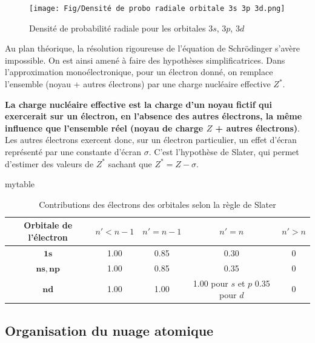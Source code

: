 \documentclass{article}
\begin{document}
\begin{figure}[ht]
    \centering
    \texttt{[image: Fig/Densité de probo radiale orbitale 3s 3p 3d.png]}
    \caption{Densité de probabilité radiale pour les orbitales $3s$, $3p$, $3d$}
    \label{fig:Densité de probo radiale orbitale 3s 3p 3d}
\end{figure}

Au plan théorique, la résolution rigoureuse de l'équation de Schrödinger s'avère impossible. On est ainsi amené à faire des hypothèses simplificatrices. Dans l'approximation monoélectronique, pour un électron donné, on remplace l'ensemble (noyau + autres électrons) par une charge nucléaire effective $Z^*$. 

\textbf{La charge nucléaire effective est la charge d'un noyau fictif
qui exercerait sur un électron, en l'absence des autres électrons,
la même influence que l'ensemble réel (noyau de charge $Z$ + autres
électrons)}. Les autres électrons exercent donc, sur un électron particulier,
un effet d'écran représenté par une constante d'écran $\sigma$.
C'est l'hypothèse de Slater, qui permet d'estimer des valeurs de $Z^*$ sachant que
$Z^* = Z - \sigma$.

\begin{collect*}{mytable}{\setcounter{duptable}{\value{table}}}{}{}{}
\begin{table}[h]
    \centering
    \begin{tabular}{|c|c|c|c|c|}
     \hline
        \textbf{Orbitale de l'électron} & $n'<n-1$ & $n'=n-1$ & $n'=n$ & $n'>n$ \\ \hline
        $\bm{1s}$ & 1.00 & 0.85 & 0.30 & 0 \\ \hline
        $\bm{ns, np}$ & 1.00 &  0.85 & 0.35 & 0 \\ \hline
        $\bm{nd}$ & 1.00 & 1.00 & \makecell{1.00 pour $s$ et $p$ \\ 0.35 pour $d$} & 0 \\ \hline
    \end{tabular}
    \caption{Contributions des électrons des orbitales selon la règle de Slater}
    \label{tab:Contributions des électrons des orbitales selon la règle de Slater}
\end{table}
\end{collect*}

\subsection{Organisation du nuage atomique}
\end{document}
